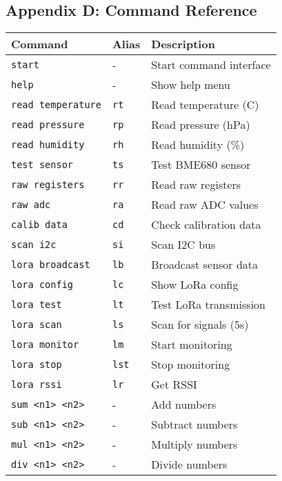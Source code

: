 \documentclass[11pt,a4paper]{article}
\begin{document}
\subsection{Appendix D: Command Reference}
\begin{longtable}{|l|l|l|}
\hline
\textbf{Command} & \textbf{Alias} & \textbf{Description} \\
\hline
\endhead
\hline
\endfoot
\texttt{start} & - & Start command interface \\
\hline
\texttt{help} & - & Show help menu \\
\hline
\texttt{read temperature} & \texttt{rt} & Read temperature (C) \\
\hline
\texttt{read pressure} & \texttt{rp} & Read pressure (hPa) \\
\hline
\texttt{read humidity} & \texttt{rh} & Read humidity (\%) \\
\hline
\texttt{test sensor} & \texttt{ts} & Test BME680 sensor \\
\hline
\texttt{raw registers} & \texttt{rr} & Read raw registers \\
\hline
\texttt{raw adc} & \texttt{ra} & Read raw ADC values \\
\hline
\texttt{calib data} & \texttt{cd} & Check calibration data \\
\hline
\texttt{scan i2c} & \texttt{si} & Scan I2C bus \\
\hline
\texttt{lora broadcast} & \texttt{lb} & Broadcast sensor data \\
\hline
\texttt{lora config} & \texttt{lc} & Show LoRa config \\
\hline
\texttt{lora test} & \texttt{lt} & Test LoRa transmission \\
\hline
\texttt{lora scan} & \texttt{ls} & Scan for signals (5s) \\
\hline
\texttt{lora monitor} & \texttt{lm} & Start monitoring \\
\hline
\texttt{lora stop} & \texttt{lst} & Stop monitoring \\
\hline
\texttt{lora rssi} & \texttt{lr} & Get RSSI \\
\hline
\texttt{sum <n1> <n2>} & - & Add numbers \\
\hline
\texttt{sub <n1> <n2>} & - & Subtract numbers \\
\hline
\texttt{mul <n1> <n2>} & - & Multiply numbers \\
\hline
\texttt{div <n1> <n2>} & - & Divide numbers \\
\hline
\end{longtable}
\end{document}
